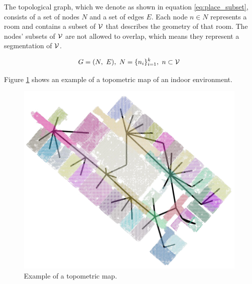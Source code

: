 The topological graph, which we denote as shown in equation \ref{eq:place_subset}, consists of a set of nodes \(N\) and a set of edges \(E\). Each node \(n \in N\) represents a room and contains a subset of \(\mathcal{V}\) that describes the geometry of that room. The nodes' subsets of \(\mathcal{V}\) are not allowed to overlap, which means they represent a segmentation of \(\mathcal{V}\).

\begin{equation}
    \label{eq:place_subset}
    G=(N,\ E),\ N=\{n_i\}_{i=1}^k,\ n \subset \mathcal{V}
\end{equation}

Figure \ref{fig:topometricmap} shows an example of a topometric map of an indoor environment.

\begin{figure}[h]
    \centering
    \includegraphics*[width=.7\textwidth]{./fig/area_1_topo_01.png}
    \caption{Example of a topometric map.}
    \label{fig:topometricmap}
\end{figure}


